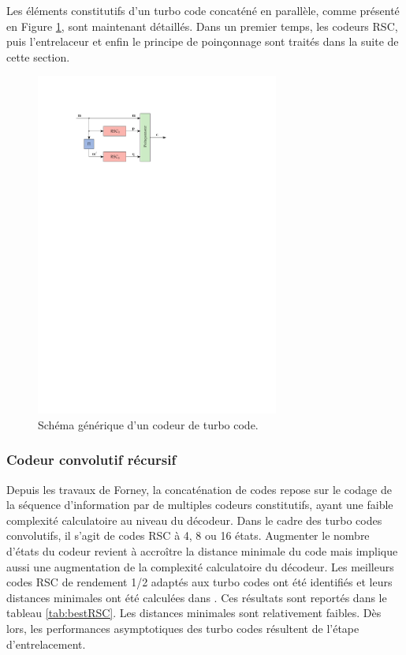 Les éléments constitutifs d'un turbo code concaténé en parallèle, comme présenté en Figure \ref{fig:turboEnc}, sont 
maintenant détaillés. Dans un premier temps, les codeurs RSC, puis l'entrelaceur et enfin le principe de poinçonnage sont 
traités dans la suite de cette section.

\begin{figure}[!h]
	\centering
	\includegraphics[width=8cm]{main/ch1_fig/turboEnc.pdf}
	\caption{\label{fig:turboEnc} Schéma générique d'un codeur de turbo code.}
\end{figure}


\subsubsection{Codeur convolutif récursif}
Depuis les travaux de Forney, la concaténation de codes repose sur le codage de la séquence d'information par de multiples codeurs 
constitutifs, ayant une faible complexité calculatoire au niveau du décodeur. Dans le cadre des turbo codes convolutifs, il s'agit de codes RSC à 4, 8 ou 16 états.
Augmenter le nombre d'états du codeur revient à accroître la distance minimale du code mais implique aussi une augmentation 
de la complexité calculatoire du décodeur. Les meilleurs codes RSC de rendement 1/2 adaptés aux turbo codes ont été identifiés 
et leurs distances minimales ont été calculées dans \cite{RSCdist}. Ces résultats sont reportés dans le tableau \ref{tab:bestRSC}. 
Les distances minimales sont relativement faibles. Dès lors, les performances asymptotiques des turbo codes résultent de l'étape 
d'entrelacement. \vspace*{3ex}

